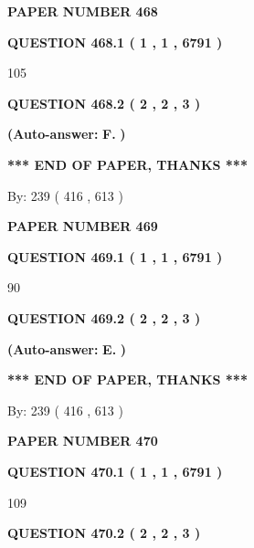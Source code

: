\documentclass[12pt]{article}
\begin{document}
   
\newpage 
\setcounter{page}{ 
   468001 } 
   
   
 {\textbf{ \Large{ PAPER NUMBER  468  }}}
   
   
   
   
  
  
{\textbf{\large{QUESTION
468.1 
 ( 1 , 1 , 6791 )
}}}

105
  
  
{\textbf{\large{QUESTION
468.2 
 ( 2 , 2 , 3 )
}}}
 
 
{\textbf{(Auto-answer:}}
{\textbf{\large{
F.}}}
{\textbf{)}}
 
 
   
   
   
   
\vspace{1.0in} 
{\textbf{\large{ *** END OF PAPER, THANKS *** }}} 
   
   
\hspace{1.0in} By: 
 239 ( 416 ,  613 )
   
   
   
   
\newpage 
\setcounter{page}{ 
   469001 } 
   
   
 {\textbf{ \Large{ PAPER NUMBER  469  }}}
   
   
   
   
  
  
{\textbf{\large{QUESTION
469.1 
 ( 1 , 1 , 6791 )
}}}

90
  
  
{\textbf{\large{QUESTION
469.2 
 ( 2 , 2 , 3 )
}}}
 
 
{\textbf{(Auto-answer:}}
{\textbf{\large{
E.}}}
{\textbf{)}}
 
 
   
   
   
   
\vspace{1.0in} 
{\textbf{\large{ *** END OF PAPER, THANKS *** }}} 
   
   
\hspace{1.0in} By: 
 239 ( 416 ,  613 )
   
   
   
   
\newpage 
\setcounter{page}{ 
   470001 } 
   
   
 {\textbf{ \Large{ PAPER NUMBER  470  }}}
   
   
   
   
  
  
{\textbf{\large{QUESTION
470.1 
 ( 1 , 1 , 6791 )
}}}

109
  
  
{\textbf{\large{QUESTION
470.2 
 ( 2 , 2 , 3 )
}}}
 
\end{document}
